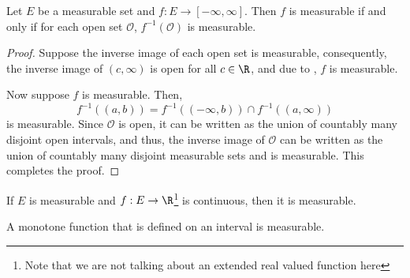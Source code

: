 \begin{proposition}
    Let $E$ be a measurable set and $f: E\to[-\infty,\infty]$. Then $f$ is measurable if and only if for each open set $\mathcal O$, $f^{-1}(\mathcal O)$ is measurable.
\end{proposition}
\begin{proof}
    Suppose the inverse image of each open set is measurable, consequently, the inverse image of $(c,\infty)$ is open for all $c\in\R$, and due to , $f$ is measurable. 

    Now suppose $f$ is measurable. Then, 
    \begin{equation*}
        f^{-1}((a,b)) = f^{-1}((-\infty, b))\cap f^{-1}((a,\infty))
    \end{equation*}
    is measurable. Since $\mathcal O$ is open, it can be written as the union of countably many disjoint open intervals, and thus, the inverse image of $\mathcal O$ can be written as the union of countably many disjoint measurable sets and is measurable. This completes the proof.
\end{proof}

\begin{corollary}
    If $E$ is measurable and $f: E\to\R$\footnote{Note that we are not talking about an extended real valued function here} is continuous, then it is measurable.
\end{corollary}

\begin{proposition}
    A monotone function that is defined on an interval is measurable.
\end{proposition}

